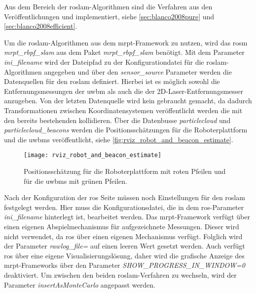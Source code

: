 Aus dem Bereich der \Gls{roslam}-Algorithmen sind die Verfahren aus den Veröffentlichungen  und  implementiert, siehe \autoref{sec:blanco2008pure} und \ref{sec:blanco2008efficient}.

Um die \Gls{roslam}-Algorithmen aus dem \Gls{mrpt}-Framework zu nutzen, wird das \Gls{rosm} \textit{mrpt\_rbpf\_slam} aus dem Paket \textit{mrpt\_rbpf\_slam} benötigt. Mit dem Parameter \textit{ini\_filename} wird der Dateipfad zu der Konfigurationdatei für die \Gls{roslam}-Algorithmen angegeben und über den \textit{sensor\_source} Parameter werden die Datenquellen für den \Gls{roslam} definiert. Hierbei ist es möglich sowohl die Entfernungsmessungen der \Gls{uwbm} als auch die der 2D-Laser-Entfernungsmesser anzugeben. Von der letzten Datenquelle wird kein gebraucht gemacht, da dadurch Transformationen zwischen Koordinatensystemen veröffentlicht werden die mit den bereits bestehenden kollidieren. Über die Datenbusse \textit{particlecloud} und \textit{particlecloud\_beacons} werden die Positionsschätzungen für die Roboterplattform und die \Glspl{uwbm} veröffentlicht, siehe \autoref{fig:rviz_robot_and_beacon_estimate}.

\begin{figure}
	\centering
	\texttt{[image: rviz\_robot\_and\_beacon\_estimate]}
	\caption{Positionsschätzung für die Roboterplattform mit roten Pfeilen und für die \Glspl{uwbm} mit grünen Pfeilen.}
	\label{fig:rviz_robot_and_beacon_estimate}
\end{figure}

Nach der Konfiguration der \Gls{ros} Seite müssen noch Einstellungen für den \Gls{roslam} festgelegt werden. Hier muss die Konfigurationsdatei, die in dem \Gls{ros}-Parameter \textit{ini\_filename} hinterlegt ist, bearbeitet werden. Das \Gls{mrpt}-Framework verfügt über einen eigenen Abspielmechanismus für aufgezeichnete Messungen. Dieser wird nicht verwendet, da \Gls{ros} über einen eigenen Mechanismus verfügt. Folglich wird der Parameter \textit{rawlog\_file=} auf einen leeren Wert gesetzt werden. Auch verfügt \Gls{ros} über eine eigene Visualisierungslösung, daher wird die grafische Anzeige des \Gls{mrpt}-Frameworks über den Parameter \textit{SHOW\_PROGRESS\_IN\_WINDOW=0} deaktiviert. Um zwischen den beiden \Gls{roslam}-Verfahren zu wechseln, wird der Parameter \textit{insertAsMonteCarlo} angepasst werden.

